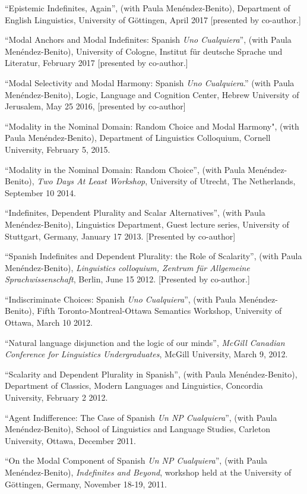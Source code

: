 \documentclass[11pt]{article}
\begin{document}
``Epistemic Indefinites, Again'', (with Paula Men\'endez-Benito), Department of English Linguistics, University of G\"{o}ttingen, April 2017 [presented by co-author.]

``Modal Anchors and Modal Indefinites: Spanish \textit{Uno Cualquiera}'', (with Paula Men\'endez-Benito), University of Cologne, Institut f\"ur deutsche Sprache und Literatur, February 2017 [presented by co-author.]

``Modal Selectivity and Modal Harmony: Spanish \textit{Uno Cualquiera}.'' (with Paula Men\'endez-Benito), Logic, Language and Cognition Center, Hebrew University of Jerusalem, May 25 2016, [presented by co-author]

``Modality in the Nominal Domain: Random Choice and Modal Harmony", (with Paula Men\'endez-Benito), Department of Linguistics Colloquium, Cornell University, February 5, 2015.

``Modality in the Nominal Domain: Random Choice'',
(with Paula Men\'endez-Benito), \textit{Two Days At Least Workshop},
University of Utrecht, The Netherlands, September 10 2014.

``Indefinites, Dependent Plurality and Scalar
Alternatives'', (with Paula Men\'endez-Benito), Linguistics Department, Guest lecture series, University of Stuttgart, Germany, January 17 2013. [Presented by co-author]

``Spanish Indefinites and Dependent Plurality: the Role of
Scalarity'',  (with Paula Men\'endez-Benito), \textit{Linguistics colloquium, Zentrum f\"{u}r
  Allgemeine Sprachwissenschaft}, Berlin, June 15 2012. [Presented by co-author.]

``Indiscriminate Choices: Spanish \textit{Uno
  Cualquiera}'', (with Paula Men\'endez-Benito), Fifth Toronto-Montreal-Ottawa Semantics Workshop, University of
Ottawa, March 10 2012.

``Natural language disjunction and the logic of our
minds'', \textit{McGill Canadian Conference for Linguistics
  Undergraduates}, McGill University, March 9, 2012.

``Scalarity and Dependent Plurality in Spanish'', (with Paula Men\'endez-Benito),
Department of Classics, Modern Languages and Linguistics, Concordia
University, February 2 2012.

``Agent Indifference: The Case of Spanish \textit{Un NP
  Cualquiera}'', (with Paula Men\'endez-Benito), School of Linguistics and Language Studies, Carleton
University, Ottawa, December 2011. 

``On the Modal Component of Spanish \textit{Un NP
  Cualquiera}'', (with Paula Men\'endez-Benito), \textit{Indefinites
  and Beyond}, workshop held at the University of G\"{o}ttingen,
Germany, November 18-19, 2011.
\end{document}
